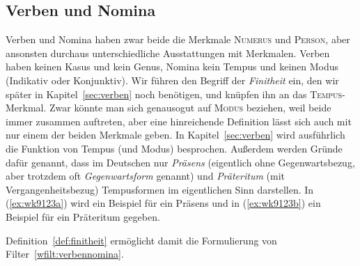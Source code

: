 
\subsection{Verben und Nomina}

\label{sec:verbennominawortklassen}


Verben und Nomina haben zwar beide die Merkmale \textsc{Numerus} und \textsc{Person}, aber ansonsten durchaus unterschiedliche Ausstattungen mit Merkmalen.
Verben haben keinen Kasus und kein Genus, Nomina kein Tempus und keinen Modus (Indikativ oder Konjunktiv).
Wir führen den Begriff der \textit{Finitheit} ein, den wir später in Kapitel~\ref{sec:verben} noch benötigen, und knüpfen ihn an das \textsc{Tempus}-Merkmal.
Zwar könnte man sich genausogut auf \textsc{Modus} beziehen, weil beide immer zusammen auftreten, aber eine hinreichende Definition lässt sich auch mit nur einem der beiden Merkmale geben.
In Kapitel~\ref{sec:verben} wird ausführlich die Funktion von Tempus (und Modus) besprochen.
Außerdem werden Gründe dafür genannt, dass im Deutschen nur \textit{Präsens} (eigentlich ohne Gegenwartsbezug, aber trotzdem oft \textit{Gegenwartsform} genannt) und \textit{Präteritum} (mit Vergangenheitsbezug) Tempusformen im eigentlichen Sinn darstellen.
In (\ref{ex:wk9123a}) wird ein Beispiel für ein Präsens und in (\ref{ex:wk9123b}) ein Beispiel für ein Präteritum gegeben.

\begin{exe}
  \ex\label{ex:wk9123}
  \begin{xlist}
  \end{xlist}
\end{exe}

Definition~\ref{def:finitheit} ermöglicht damit die Formulierung von Filter~\ref{wfilt:verbennomina}.



